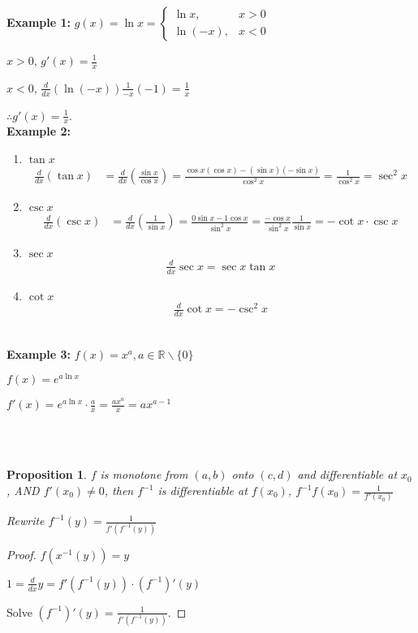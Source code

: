 \documentclass[12pt]{article}
\theoremstyle{plain}
\newtheorem{proposition}{Proposition}[subsection]
\begin{document}
    {\color{Brown}\textbf{Example 1: } $g(x) =\ln x =
    \begin{cases}
        \ln x , &x>0\\
        \ln (-x), &x<0 
    \end{cases}$

    $x>0$, $g'(x) =\frac 1x$

    $x<0$, $\frac d{dx} (\ln (-x)) \frac1{-x}(-1) =\frac 1x$

    $\therefore g'(x) = \frac1x$.\\

    \textbf{Example 2: } 
    \begin{enumerate} 
        \item {$\tan x$}
        \begin{align*}
        \frac d{dx} (\tan x) &=\frac d{dx} (\frac{\sin x}{\cos x})
        =\frac{\cos x (\cos x)-(\sin x)(-\sin x)}{\cos ^2 x}
        =\frac1{\cos ^2 x} =\sec ^2 x  
        \end{align*}
    
        \item $\csc x$
        \begin{align*}
            \frac d{dx} (\csc x) &=\frac d{dx} (\frac1 {\sin x})
            =\frac{0 \sin x - 1 \cos x}{\sin ^2 x}
            =\frac{-\cos x}{\sin ^2 x} \frac 1{\sin x}
            =-\cot x \cdot \csc x 
        \end{align*}
        
        \item  $\sec x$
        \begin{align*}
            \frac d{dx} \sec x = \sec x \tan x
        \end{align*}

        \item $\cot x$ 
        \begin{align*}
            \frac d{dx} \cot x = -\csc ^2 x
        \end{align*}\\
    \end{enumerate}


    \textbf{Example 3: } $f(x)=x^a, a\in \mathbb{R}\backslash \{0\}$
        
    $f(x) = e^{a\ln x}$

    $f'(x)=e^{a\ln x}\cdot \frac ax =\frac {ax^{a}}x=ax^{a-1}$}\\\\

    \begin{proposition}
        $f$ is monotone from $(a,b)$ onto $(c, d)$ 
        and differentiable at $x_0$, AND $f'(x_0) \neq 0$, 
        then $f^{-1} $ is differentiable at $f(x_0)$, 
        $f^{-1} f(x_0) =\frac 1{f'(x_0)}$

        Rewrite $f^{-1} (y) =\frac 1{f'(f^{-1}(y))}$
    \end{proposition}
    \begin{proof}
        $f(x^{-1}(y)) = y$ 

        $1=\frac d{dx} y = f'(f^{-1}(y))\cdot (f^{-1})'(y)$

        Solve $(f^{-1})'(y)=\frac 1{f'(f^{-1}(y))}$.
    \end{proof}
\end{document}
